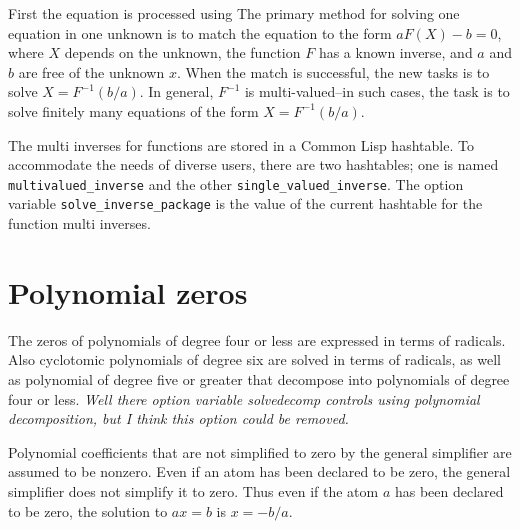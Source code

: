 \documentclass[]{scrartcl}
\newcommand{\multivaluedinverse}{\texttt{multivalued\_inverse}}
\newcommand{\singlevaluedinverse}{\texttt{single\_valued\_inverse}}
\newcommand{\solveinversepackage}{\texttt{solve\_inverse\_package}}
\begin{document}
First the equation is processed using
The primary method for solving one equation in one unknown is to match the equation to the form \(a F(X) - b = 0\), where \(X\) depends on the unknown, the function \(F\) has a known inverse, and \(a\) and \(b\) are free of the unknown \(x\). When the match is successful, the new tasks is to solve \(X = F^{-1}(b/a) \). In general, \(F^{-1}\) is multi-valued--in such cases, the task is to solve finitely many equations of the form  \(X = F^{-1}(b/a) \).

The multi inverses for functions are stored in a Common Lisp hashtable. To accommodate the needs of diverse users,
there are two hashtables; one is named \multivaluedinverse\/ and the other \singlevaluedinverse.  The option
variable \solveinversepackage\/ is the value of the current hashtable for the function multi inverses.

\section{Polynomial zeros}

The zeros of polynomials of degree four or less are expressed in terms of radicals. Also  cyclotomic polynomials of degree six are solved in terms of radicals, as well as polynomial of degree five or greater that decompose into polynomials of degree four or less. \emph{Well there option variable solvedecomp controls using polynomial decomposition, but I think this option could be removed.}

\begin{alphalist}[]

\item  Polynomial coefficients that are not simplified to zero by the  general simplifier are assumed to be nonzero. Even if an atom has been declared to be zero, the general simplifier does not simplify  it to zero. Thus even if the atom \(a\) has been declared to be zero, the solution to \(a x = b\) is \(x = -b/a \).



\end{alphalist}
\end{document}
